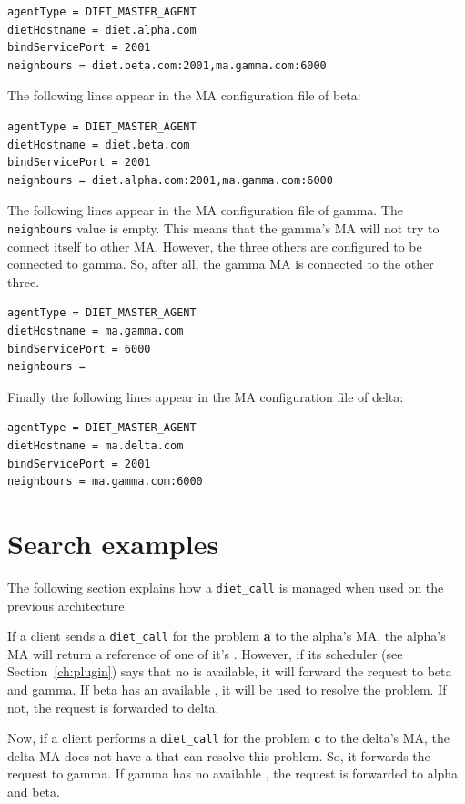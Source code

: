 \begin{verbatim}
agentType = DIET_MASTER_AGENT
dietHostname = diet.alpha.com
bindServicePort = 2001
neighbours = diet.beta.com:2001,ma.gamma.com:6000
\end{verbatim}

The following lines appear in the MA configuration file of beta:

\begin{verbatim}
agentType = DIET_MASTER_AGENT
dietHostname = diet.beta.com
bindServicePort = 2001
neighbours = diet.alpha.com:2001,ma.gamma.com:6000
\end{verbatim}

The following lines appear in the MA configuration file of gamma. The
\texttt{neighbours} value is empty. This means that the gamma's MA
will not try to connect itself to other MA. However, the three others
are configured to be connected to gamma. So, after all, the gamma MA
is connected to the other three.

\begin{verbatim}
agentType = DIET_MASTER_AGENT
dietHostname = ma.gamma.com
bindServicePort = 6000
neighbours = 
\end{verbatim}

Finally the following lines appear in the MA configuration file of delta:

\begin{verbatim}
agentType = DIET_MASTER_AGENT
dietHostname = ma.delta.com
bindServicePort = 2001
neighbours = ma.gamma.com:6000
\end{verbatim}

\section{Search examples}

The following section explains how a \texttt{diet\_call} is managed
when used on the previous architecture.

If a client sends a \texttt{diet\_call} for the problem \textbf{a} to
the alpha's MA, the alpha's MA will return a reference of one of it's
\sed. However, if its scheduler (see Section~\ref{ch:plugin}) says
that no \sed is available, it will forward the request to beta and
gamma. If beta has an available \sed, it will be used to resolve the
problem. If not, the request is forwarded to delta.

Now, if a client performs a \texttt{diet\_call} for the problem
\textbf{c} to the delta's MA, the delta MA does not have a \sed that
can resolve this problem. So, it forwards the request to gamma. If
gamma has no available \sed, the request is forwarded to alpha and
beta.


